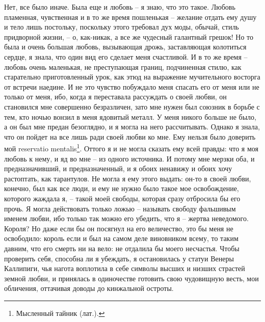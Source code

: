 Нет, все  было иначе. Была  еще и  любовь -- я  знаю, что это  такое. Любовь
пламенная, чувственная и в то же время пошленькая -- желание отдать ему душу
и  тело лишь  постольку, поскольку  этого требовал  дух моды,  обычай, стиль
придворной жизни, -- о, как-никак, а все же чудесный галантный грешок! Но то
была  и  очень большая  любовь,  вызывающая  дрожь, заставляющая  колотиться
сердце, я знала, что  один вид его сделает меня счастливой. И  в то же время
-- любовь  очень маленькая, не  преступающая границ, подчиненная  стилю, как
старательно приготовленный урок, как этюд на выражение мучительного восторга
от встречи наедине. И не это чувство  побуждало меня спасать его от меня или
не только  от меня, ибо,  когда я переставала  рассуждать о своей  любви, он
становился мне совершенно безразличен, зато мне нужен был союзник в борьбе с
тем, кто ночью вонзил в меня ядовитый  металл. У меня никого больше не было,
а он  был мне предан  безоглядно, и я могла  на него рассчитывать.  Однако я
знала, что он  пойдет на все лишь  ради своей любви ко мне.  Ему нельзя было
доверить мой reservatio  mentalis\footnote{Мысленный тайник (лат.).}. Оттого
я и не могла сказать  ему всей правды: что я моя любовь к  нему, и яд во мне
--  из одного  источника.  И потому  мне мерзки  оба,  и предназначивший,  и
предназначенный, и я обоих ненавижу и обоих хочу растоптать, как тарантулов.
Не могла я ему этого выдать: он-то в своей любви, конечно, был как все люди,
и ему  не нужно было  такое мое освобождение,  которого жаждала я,  -- такой
моей  свободы, которая  сразу отбросила  бы его  прочь. Я  могла действовать
только  ложью --  называть свободу  фальшивым именем  любви, ибо  только так
можно его убедить,  что я -- жертва  неведомого. Короля? Но даже  если бы он
посягнул на его величество, это бы меня  не освободило: король если и был на
самом деле виновником всему, то таким давним,  что его смерть ни на вело: не
отдалила бы моего несчастья. Чтобы проверить себя, способна ли я убеждать, я
остановилась у статуи Венеры Каллипиги,  чья нагота воплотила в себе символы
высших и  низших страстей земной  любви, и принялась в  одиночестве готовить
свою  чудовищную  весть,  мои  обличения,  оттачивая  доводы  до  кинжальной
остроты.


